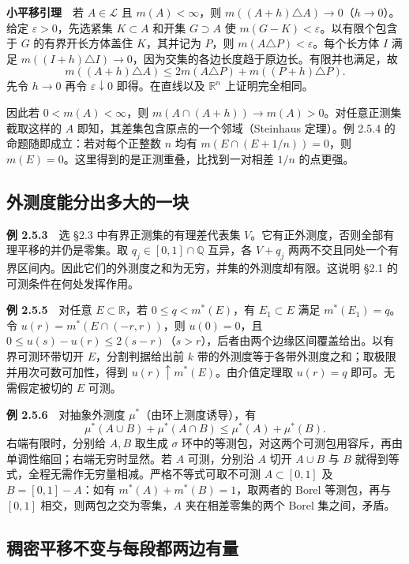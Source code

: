 \documentclass[11pt,a4paper]{article}
\begin{document}
\textbf{小平移引理}　若 \(A\in\mathcal L\) 且 \(m(A)<\infty\)，则 \(m((A+h)\triangle A)\to0\)（\(h\to0\)）。给定 \(\varepsilon>0\)，先选紧集 \(K\subset A\) 和开集 \(G\supset A\) 使 \(m(G-K)<\varepsilon\)。以有限个包含于 \(G\) 的有界开长方体盖住 \(K\)，其并记为 \(P\)，则 \(m(A\triangle P)<\varepsilon\)。每个长方体 \(I\) 满足 \(m((I+h)\triangle I)\to0\)，因为交集的各边长度趋于原边长。有限并也满足，故 \[
m((A+h)\triangle A)\leq 2m(A\triangle P)+m((P+h)\triangle P).
\] 先令 \(h\to0\) 再令 \(\varepsilon\downarrow0\) 即得。在直线以及 \(\mathbb R^n\) 上证明完全相同。

因此若 \(0<m(A)<\infty\)，则 \(m(A\cap(A+h))\to m(A)>0\)。对任意正测集截取这样的 \(A\) 即知，其差集包含原点的一个邻域（Steinhaus 定理）。例 2.5.4 的命题随即成立：若对每个正整数 \(n\) 均有 \(m(E\cap(E+1/n))=0\)，则 \(m(E)=0\)。这里得到的是正测重叠，比找到一对相差 \(1/n\) 的点更强。

\subsection*{外测度能分出多大的一块}\label{ux5916ux6d4bux5ea6ux80fdux5206ux51faux591aux5927ux7684ux4e00ux5757}

\textbf{例 2.5.3}　选 \S{}2.3 中有界正测集的有理差代表集 \(V\)。它有正外测度，否则全部有理平移的并仍是零集。取 \(q_j\in[0,1]\cap\mathbb Q\) 互异，各 \(V+q_j\) 两两不交且同处一个有界区间内。因此它们的外测度之和为无穷，并集的外测度却有限。这说明 \S{}2.1 的可测条件在何处发挥作用。

\textbf{例 2.5.5}　对任意 \(E\subset\mathbb R\)，若 \(0\leq q<m^*(E)\)，有 \(E_1\subset E\) 满足 \(m^*(E_1)=q\)。令 \(u(r)=m^*(E\cap(-r,r))\)，则 \(u(0)=0\)，且 \(0\leq u(s)-u(r)\leq2(s-r)\)（\(s>r\)），后者由两个边缘区间覆盖给出。以有界可测环带切开 \(E\)，分割判据给出前 \(k\) 带的外测度等于各带外测度之和；取极限并用次可数可加性，得到 \(u(r)\uparrow m^*(E)\)。由介值定理取 \(u(r)=q\) 即可。无需假定被切的 \(E\) 可测。

\textbf{例 2.5.6}　对抽象外测度 \(\mu^*\)（由环上测度诱导），有 \[
\mu^*(A\cup B)+\mu^*(A\cap B)\leq\mu^*(A)+\mu^*(B).
\] 右端有限时，分别给 \(A,B\) 取生成 \(\sigma\) 环中的等测包，对这两个可测包用容斥，再由单调性缩回；右端无穷时显然。若 \(A\) 可测，分别沿 \(A\) 切开 \(A\cup B\) 与 \(B\) 就得到等式，全程无需作无穷量相减。严格不等式可取不可测 \(A\subset[0,1]\) 及 \(B=[0,1]-A\)：如有 \(m^*(A)+m^*(B)=1\)，取两者的 Borel 等测包，再与 \([0,1]\) 相交，则两包之交为零集，\(A\) 夹在相差零集的两个 Borel 集之间，矛盾。

\subsection*{稠密平移不变与每段都两边有量}\label{ux7a20ux5bc6ux5e73ux79fbux4e0dux53d8ux4e0eux6bcfux6bb5ux90fdux4e24ux8fb9ux6709ux91cf}
\end{document}
